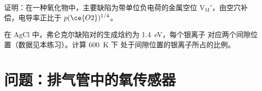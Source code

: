 \begin{exercise}[$\star\star\star$]\label{exo:b3:solid-state:11}
证明：在一种氧化物中，主要缺陷为带单位负电荷的金属空位
$\mathrm{V_M'}$，由空穴补偿，电导率正比于 $p(\ce{O2})^{1/4}$。
\end{exercise}

\begin{exercise}[$\star\star\star$]\label{exo:b3:solid-state:12}
在 AgCl 中，弗仑克尔缺陷对的生成焓约为 \qty{1.4}{eV}，每个银离子
对应两个间隙位置（数据见本练习）。计算 \qty{600}{K} 下
处于间隙位置的银离子所占的比例。
\end{exercise}

\section{问题：排气管中的氧传感器}


